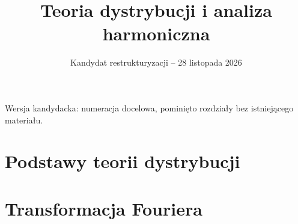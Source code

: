 \documentclass[11pt,a4paper]{article}
\title{Teoria dystrybucji i analiza harmoniczna}
\author{}
\date{Kandydat restrukturyzacji -- 28 listopada 2026}
\numberwithin{equation}{section}
\theoremstyle{plain}
\theoremstyle{definition}
\theoremstyle{remark}
\begin{document}
\maketitle
\noindent Wersja kandydacka: numeracja docelowa, pominięto rozdziały bez istniejącego materiału.\par
\tableofcontents
\clearpage
\setcounter{part}{0}
\part{Podstawy teorii dystrybucji}
\setcounter{section}{0}

\setcounter{section}{1}

\setcounter{section}{2}

\setcounter{section}{3}

\setcounter{section}{4}

\setcounter{section}{5}

\setcounter{section}{6}

\setcounter{section}{7}

\setcounter{part}{1}
\part{Transformacja Fouriera}
\setcounter{section}{8}

\setcounter{section}{9}

\setcounter{section}{10}

\setcounter{section}{11}

\setcounter{section}{12}

\setcounter{section}{13}

\setcounter{section}{14}

\setcounter{section}{15}

\setcounter{part}{2}
\end{document}

